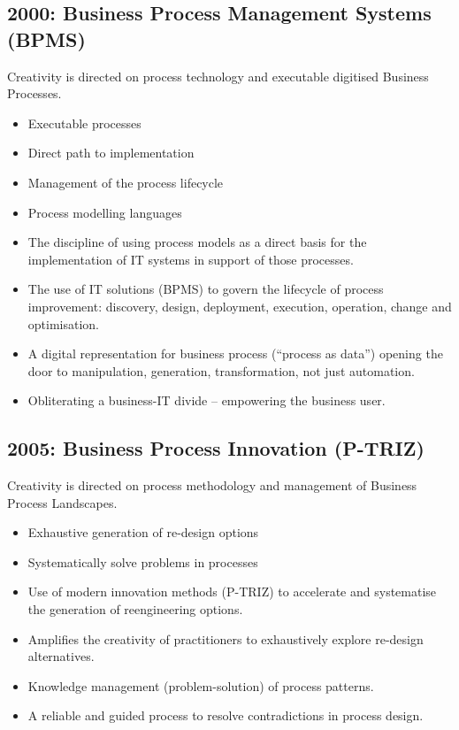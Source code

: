 \documentclass[11pt,a4paper]{article}
\begin{document}
\subsection{2000: Business Process Management Systems (BPMS)}
Creativity is directed on process technology and executable digitised Business
Processes. 
\begin{itemize}
\item Executable processes
\item Direct path to implementation
\item Management of the process lifecycle
\item Process modelling languages
\item The discipline of using process models as a direct basis for the
  implementation of IT systems in support of those processes.
\item The use of IT solutions (BPMS) to govern the lifecycle of process
  improvement: discovery, design, deployment, execution, operation, change and
  optimisation.
\item A digital representation for business process (“process as data”)
  opening the door to manipulation, generation, transformation, not just
  automation.
\item Obliterating a business-IT divide – empowering the business user. 
\end{itemize}

\subsection{2005: Business Process Innovation (P-TRIZ)}
Creativity is directed on process methodology and management of Business
Process Landscapes.
\begin{itemize}
\item Exhaustive generation of re-design options
\item Systematically solve problems in processes
\item Use of modern innovation methods (P-TRIZ) to accelerate and systematise
  the generation of reengineering options.
\item Amplifies the creativity of practitioners to exhaustively explore
  re-design alternatives.
\item Knowledge management (problem-solution) of process patterns.
\item A reliable and guided process to resolve contradictions in process
  design.
\end{itemize}
\end{document}
